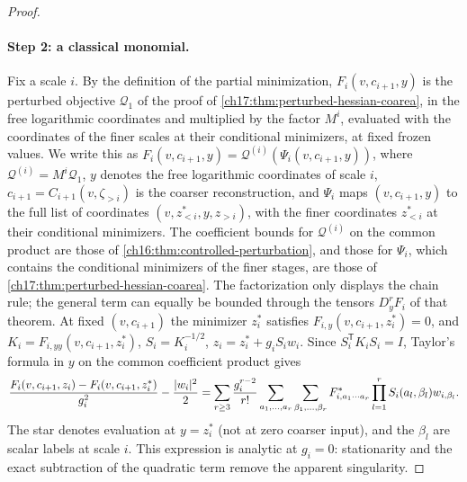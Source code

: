 \begin{proof}
\paragraph{Step 2: a classical monomial.}
Fix a scale $i$. By the definition of the partial minimization, $F_i(v,c_{i+1},y)$ is the perturbed objective $\mathcal Q_1$ of the proof of \cref{ch17:thm:perturbed-hessian-coarea}, in the free logarithmic coordinates and multiplied by the factor $M^i$, evaluated with the coordinates of the finer scales at their conditional minimizers, at fixed frozen values. We write this as $F_i(v,c_{i+1},y)=\mathcal Q^{(i)}(\Psi_i(v,c_{i+1},y))$, where $\mathcal Q^{(i)}=M^i\mathcal Q_1$, $y$ denotes the free logarithmic coordinates of scale $i$, $c_{i+1}=C_{i+1}(v,\zeta_{>i})$ is the coarser reconstruction, and $\Psi_i$ maps $(v,c_{i+1},y)$ to the full list of coordinates $(v,z^*_{<i},y,z_{>i})$, with the finer coordinates $z^*_{<i}$ at their conditional minimizers. The coefficient bounds for $\mathcal Q^{(i)}$ on the common product are those of \cref{ch16:thm:controlled-perturbation}, and those for $\Psi_i$, which contains the conditional minimizers of the finer stages, are those of \cref{ch17:thm:perturbed-hessian-coarea}. The factorization only displays the chain rule; the general term can equally be bounded through the tensors $D_y^rF_i$ of that theorem. At fixed $(v,c_{i+1})$ the minimizer $z_i^*$ satisfies $F_{i,y}(v,c_{i+1},z_i^*)=0$, and $K_i=F_{i,yy}(v,c_{i+1},z_i^*)$, $S_i=K_i^{-1/2}$, $z_i=z_i^*+g_iS_iw_i$. Since $S_i^{\mathsf T}K_iS_i=I$, Taylor's formula in $y$ on the common coefficient product gives
\[
 \frac{F_i(v,c_{i+1},z_i)-F_i(v,c_{i+1},z_i^*)}{g_i^2}-\frac{\lvert w_i\rvert^2}2=\sum_{r\ge3}\frac{g_i^{r-2}}{r!}\sum_{a_1,\ldots,a_r}\sum_{\beta_1,\ldots,\beta_r}F_{i,a_1\cdots a_r}^*\prod_{l=1}^rS_i(a_l,\beta_l)w_{i,\beta_l}.
\]
The star denotes evaluation at $y=z_i^*$ (not at zero coarser input), and the $\beta_l$ are scalar labels at scale $i$. This expression is analytic at $g_i=0$: stationarity and the exact subtraction of the quadratic term remove the apparent singularity.


\end{proof}
